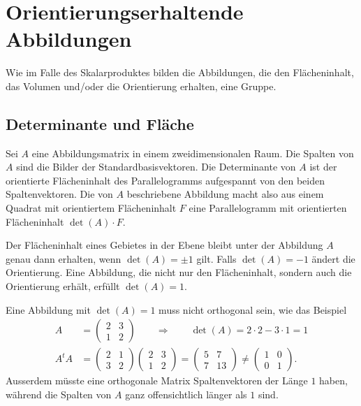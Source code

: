 %
%
% 
\section{Orientierungserhaltende Abbildungen}
Wie im Falle des Skalarproduktes bilden die Abbildungen, die den Flächeninhalt,
das Volumen und/oder die Orientierung erhalten, eine Gruppe.

\subsection{Determinante und Fläche}
Sei $A$ eine Abbildungsmatrix in einem zweidimensionalen Raum.
Die Spalten von $A$ sind die Bilder der Standardbasisvektoren.
Die Determinante von $A$ ist der orientierte Flächeninhalt des Parallelogramms 
aufgespannt von den beiden Spaltenvektoren.
Die von $A$ beschriebene Abbildung macht also aus einem Quadrat mit
orientiertem Flächeninhalt $F$
eine Parallelogramm mit orientierten Flächeninhalt $\det(A)\cdot F$.

Der Flächeninhalt eines Gebietes in der Ebene bleibt unter der Abbildung
$A$ genau dann erhalten, wenn $\det(A)=\pm 1$ gilt.
Falls $\det(A)=-1$ ändert die Orientierung.
Eine Abbildung, die nicht nur den Flächeninhalt, sondern auch die
Orientierung erhält, erfüllt $\det(A)=1$.

Eine Abbildung mit $\det(A)=1$ muss nicht orthogonal sein, wie das Beispiel
\begin{align*}
A
&=
\begin{pmatrix}2&3\\1&2\end{pmatrix}
\qquad\Rightarrow\qquad
\det(A) = 2\cdot 2-3\cdot 1 =1
\\
A^tA
&=
\begin{pmatrix}2&1\\3&2\end{pmatrix}
\begin{pmatrix}2&3\\1&2\end{pmatrix}
=
\begin{pmatrix}
5&7\\
7&13
\end{pmatrix}
\ne
\begin{pmatrix}
1&0\\
0&1
\end{pmatrix}.
\end{align*}
Ausserdem müsste eine orthogonale Matrix Spaltenvektoren der Länge $1$ haben,
während die Spalten von $A$ ganz offensichtlich länger als $1$ sind.

